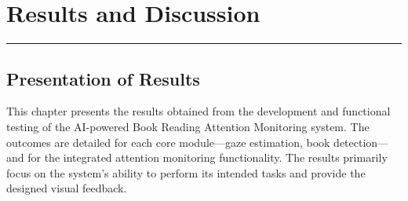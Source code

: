 \chapter{Results and Discussion}
\vspace{-1.5cm}
\hspace{-1cm}\rule{19cm}{0.4pt} 

\section{Presentation of Results}
This chapter presents the results obtained from the development and functional testing of the AI-powered Book Reading Attention Monitoring system. The outcomes are detailed for each core module—gaze estimation, book detection—and for the integrated attention monitoring functionality. The results primarily focus on the system's ability to perform its intended tasks and provide the designed visual feedback.

